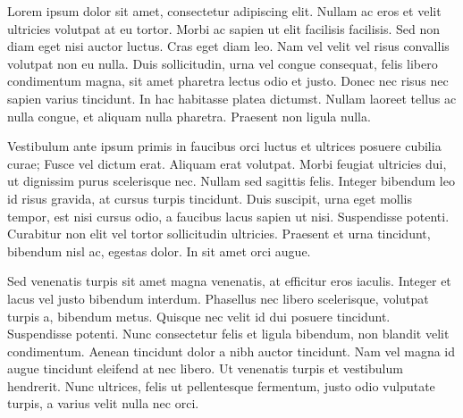Lorem ipsum dolor sit amet, consectetur adipiscing elit. Nullam ac eros et velit ultricies volutpat at eu tortor. Morbi ac sapien ut elit facilisis facilisis. Sed non diam eget nisi auctor luctus. Cras eget diam leo. Nam vel velit vel risus convallis volutpat non eu nulla. Duis sollicitudin, urna vel congue consequat, felis libero condimentum magna, sit amet pharetra lectus odio et justo. Donec nec risus nec sapien varius tincidunt. In hac habitasse platea dictumst. Nullam laoreet tellus ac nulla congue, et aliquam nulla pharetra. Praesent non ligula nulla.

Vestibulum ante ipsum primis in faucibus orci luctus et ultrices posuere cubilia curae; Fusce vel dictum erat. Aliquam erat volutpat. Morbi feugiat ultricies dui, ut dignissim purus scelerisque nec. Nullam sed sagittis felis. Integer bibendum leo id risus gravida, at cursus turpis tincidunt. Duis suscipit, urna eget mollis tempor, est nisi cursus odio, a faucibus lacus sapien ut nisi. Suspendisse potenti. Curabitur non elit vel tortor sollicitudin ultricies. Praesent et urna tincidunt, bibendum nisl ac, egestas dolor. In sit amet orci augue.

Sed venenatis turpis sit amet magna venenatis, at efficitur eros iaculis. Integer et lacus vel justo bibendum interdum. Phasellus nec libero scelerisque, volutpat turpis a, bibendum metus. Quisque nec velit id dui posuere tincidunt. Suspendisse potenti. Nunc consectetur felis et ligula bibendum, non blandit velit condimentum. Aenean tincidunt dolor a nibh auctor tincidunt. Nam vel magna id augue tincidunt eleifend at nec libero. Ut venenatis turpis et vestibulum hendrerit. Nunc ultrices, felis ut pellentesque fermentum, justo odio vulputate turpis, a varius velit nulla nec orci.